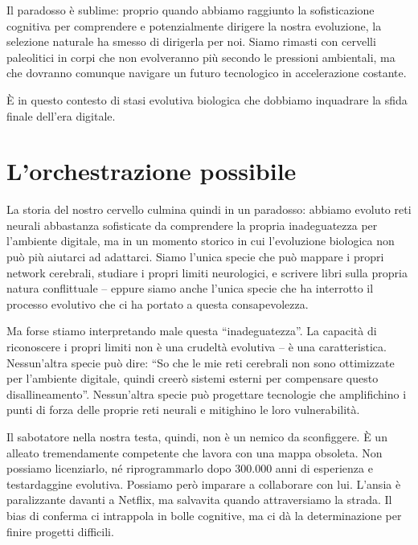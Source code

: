 Il paradosso è sublime: proprio quando abbiamo raggiunto la sofisticazione cognitiva per comprendere e potenzialmente dirigere la nostra evoluzione, la selezione naturale ha smesso di dirigerla per noi. Siamo rimasti con cervelli paleolitici in corpi che non evolveranno più secondo le pressioni ambientali, ma che dovranno comunque navigare un futuro tecnologico in accelerazione costante.

È in questo contesto di stasi evolutiva biologica che dobbiamo inquadrare la sfida finale dell'era digitale.

\section{L'orchestrazione possibile}

La storia del nostro cervello culmina quindi in un paradosso: abbiamo evoluto reti neurali abbastanza sofisticate da comprendere la propria inadeguatezza per l'ambiente digitale, ma in un momento storico in cui l'evoluzione biologica non può più aiutarci ad adattarci. Siamo l'unica specie che può mappare i propri network cerebrali, studiare i propri limiti neurologici, e scrivere libri sulla propria natura conflittuale – eppure siamo anche l'unica specie che ha interrotto il processo evolutivo che ci ha portato a questa consapevolezza.

Ma forse stiamo interpretando male questa ``inadeguatezza''. La capacità di riconoscere i propri limiti non è una crudeltà evolutiva – è una caratteristica. Nessun'altra specie può dire: ``So che le mie reti cerebrali non sono ottimizzate per l'ambiente digitale, quindi creerò sistemi esterni per compensare questo disallineamento''. Nessun'altra specie può progettare tecnologie che amplifichino i punti di forza delle proprie reti neurali e mitighino le loro vulnerabilità.

Il sabotatore nella nostra testa, quindi, non è un nemico da sconfiggere. È un alleato tremendamente competente che lavora con una mappa obsoleta. Non possiamo licenziarlo, né riprogrammarlo dopo 300.000 anni di esperienza e testardaggine evolutiva. Possiamo però imparare a collaborare con lui. L'ansia è paralizzante davanti a Netflix, ma salvavita quando attraversiamo la strada. Il bias di conferma ci intrappola in bolle cognitive, ma ci dà la determinazione per finire progetti difficili.


